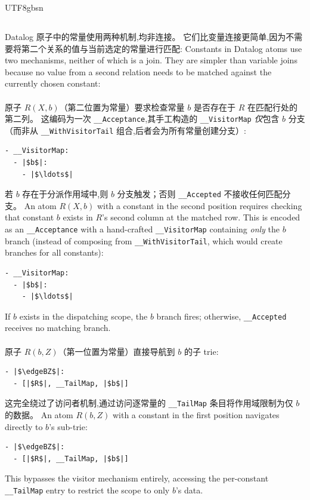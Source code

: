 \begin{CJK*}{UTF8}{gbsn}
\subsection{}
\label{sec:encoding-constants}

\ifPaperChinese
Datalog 原子中的常量使用两种机制,均非连接。
它们比变量连接更简单,因为不需要将第二个关系的值与当前选定的常量进行匹配:
\else
Constants in Datalog atoms use two mechanisms, neither of
which is a join.
They are simpler than variable joins because no value from a
second relation needs to be matched against the currently chosen
constant:
\fi

\paragraph{}
\ifPaperChinese
原子 $R(X, b)$（第二位置为常量）要求检查常量 $b$ 是否存在于 $R$ 在匹配行处的第二列。
这编码为一次 \texttt{__Acceptance},其手工构造的 \texttt{__VisitorMap} \emph{仅}包含 $b$ 分支（而非从 \texttt{__WithVisitorTail} 组合,后者会为所有常量创建分支）:
{\small
\begin{verbatim}
- __VisitorMap:
  - |$b$|:
    - |$\ldots$|
\end{verbatim}
}
若 $b$ 存在于分派作用域中,则 $b$ 分支触发；否则 \texttt{__Accepted} 不接收任何匹配分支。
\else
An atom $R(X, b)$ with a constant in the second position
requires checking that constant $b$ exists in $R$'s
second column at the matched row.
This is encoded as an \texttt{__Acceptance} with a
hand-crafted \texttt{__VisitorMap} containing \emph{only}
the $b$ branch (instead of composing from
  \texttt{__WithVisitorTail}, which would create branches for
all constants):
{\small
\begin{verbatim}
- __VisitorMap:
  - |$b$|:
    - |$\ldots$|
\end{verbatim}
}
If $b$ exists in the dispatching scope, the
$b$ branch fires; otherwise, \texttt{__Accepted}
receives no matching branch.
\fi

\paragraph{}
\ifPaperChinese
原子 $R(b, Z)$（第一位置为常量）直接导航到 $b$ 的子 trie:
\begin{verbatim}
- |$\edgeBZ$|:
  - [|$R$|, __TailMap, |$b$|]
\end{verbatim}
这完全绕过了访问者机制,通过访问逐常量的 \texttt{__TailMap} 条目将作用域限制为仅 $b$ 的数据。
\else
An atom $R(b, Z)$ with a constant in the first position
navigates directly to $b$'s sub-trie:
\begin{verbatim}
- |$\edgeBZ$|:
  - [|$R$|, __TailMap, |$b$|]
\end{verbatim}
This bypasses the visitor mechanism entirely, accessing
the per-constant \texttt{__TailMap} entry to restrict the
scope to only $b$'s data.
\fi


\end{CJK*}
